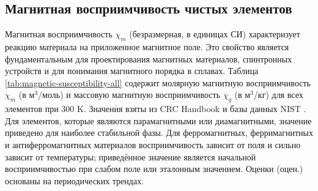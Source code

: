 \documentclass[12pt,a4paper]{article}
\begin{document}
	\subsection{Магнитная восприимчивость чистых элементов}
	\label{subsec:magnetic-susceptibility}
	
	Магнитная восприимчивость \(\chi_m\) (безразмерная, в единицах СИ) характеризует реакцию материала на приложенное магнитное поле. Это свойство является фундаментальным для проектирования магнитных материалов, спинтронных устройств и для понимания магнитного порядка в сплавах. Таблица \ref{tab:magnetic-susceptibility-all} содержит молярную магнитную восприимчивость \(\chi_m\) (в м\(^3\)/моль) и массовую магнитную восприимчивость \(\chi_g\) (в м\(^3\)/кг) для всех элементов при 300 K. Значения взяты из CRC Handbook \cite{CRC} и базы данных NIST \cite{NIST}. Для элементов, которые являются парамагнитными или диамагнитными, значение приведено для наиболее стабильной фазы. Для ферромагнитных, ферримагнитных и антиферромагнитных материалов восприимчивость зависит от поля и сильно зависит от температуры; приведённое значение является начальной восприимчивостью при слабом поле или эталонным значением. Оценки (оцен.) основаны на периодических трендах.
	
\end{document}

